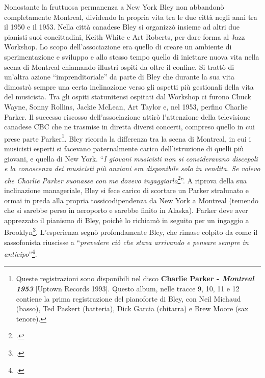 Nonostante la fruttuosa permanenza a New York Bley non abbandonò completamente Montreal, dividendo la propria vita tra le due città negli anni tra il 1950 e il 1953. Nella città canadese Bley si organizzò insieme ad altri due pianisti suoi concittadini, Keith White e Art Roberts, per dare forma al Jazz Workshop. Lo scopo dell'associazione era quello di creare un ambiente di sperimentazione e sviluppo e allo stesso tempo quello di iniettare nuova vita nella scena di Montreal chiamando illustri ospiti da oltre il confine. Si trattò di un'altra azione ``imprenditoriale'' da parte di Bley che durante la sua vita dimostrò sempre una certa inclinazione verso gli aspetti più gestionali della vita del musicista. Tra gli ospiti statunitensi ospitati dal Workshop ci furono Chuck Wayne, Sonny Rollins, Jackie McLean, Art Taylor e, nel 1953, perfino Charlie Parker. Il successo riscosso dell'associazione attirò l'attenzione della televisione canadese CBC che ne trasmise in diretta diversi concerti, compreso quello in cui prese parte Parker\footnote{Queste registrazioni sono disponibili nel disco \textbf{Charlie Parker - \textit{Montreal 1953}} [Uptown Records 1993]. Questo album, nelle tracce 9, 10, 11 e 12 contiene la prima registrazione del pianoforte di Bley, con Neil Michaud (basso), Ted Paskert (batteria), Dick Garcia (chitarra) e Brew Moore (sax tenore).}. Bley ricorda la differenza tra la scena di Montreal, in cui i musicisti esperti si facevano paternalmente carico dell'istruzione di quelli più giovani, e quella di New York. ``\textit{I giovani musicisti non si consideravano discepoli e la conoscenza dei musicisti più anziani era disponibile solo in vendita. Se volevo che Charlie Parker suonasse con me dovevo ingaggiarlo}\footcite[31]{stopping}''. A riprova della sua inclinazione manageriale, Bley si fece carico di scortare un Parker stralunato e ormai in preda alla propria tossicodipendenza da New York a Montreal (temendo che si sarebbe perso in aeroporto e sarebbe finito in Alaska). Parker deve aver apprezzato il pianismo di Bley, poichè lo richiamò in seguito per un ingaggio a Brooklyn\footcite[34]{stopping}. L'esperienza segnò profondamente Bley, che rimase colpito da come il sassofonista riuscisse a ``\textit{prevedere ciò che stava arrivando e pensare sempre in anticipo}''\footcite[35]{stopping}.\par
